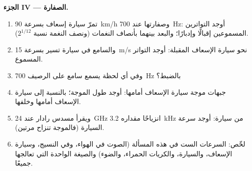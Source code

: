 \begin{problem}
\medskip
\noindent\textbf{الجزء IV --- الصفارة.}
\begin{enumerate}[resume]
  \item تمرّ سيارة إسعاف بسرعة \qty{90}{km/h} وصفارتها عند \qty{700}{Hz}:
        أوجد التواترين المسموعين إقبالًا وإدبارًا؛ والبعد
        بينهما بأنصاف النغمات (ونصف النغمة نسبة $2^{1/12}$).
  \item والسامع في سيارة تسير بسرعة \qty{15}{m/s} نحو سيارة
        الإسعاف المقبلة: أوجد التواتر المسموع.
  \item وفي أي لحظة يسمع سامع على الرصيف \qty{700}{Hz} بالضبط؟
  \item جبهات موجة سيارة الإسعاف أمامها: أوجد طول الموجة؛  بالنسبة إلى سيارة الإسعاف أمامها وخلفها.
  \item ويقرأ مسدس رادار عند \qty{24}{GHz} انزياحًا مقداره \qty{3.2}{kHz} من سيارة:
        أوجد سرعة السيارة (فالموجة تنزاح مرتين).
  \item لخّص: السرعات الست في هذه المسألة (الصوت في الهواء، وفي
        النسيج، وسيارة الإسعاف، والسيارة، والكريات الحمراء، والضوء)
        والصيغة الواحدة التي تعالجها جميعًا.
\end{enumerate}
\end{problem}
